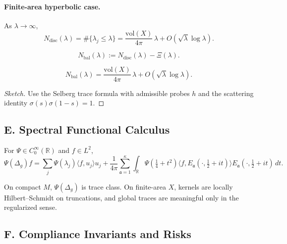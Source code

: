 \paragraph{Finite-area hyperbolic case.} As $\lambda\to\infty$,
\[
  N_{\mathrm{disc}}(\lambda)=\#\{\lambda_j\le \lambda\}
  = \frac{\mathrm{vol}(X)}{4\pi}\,\lambda + O(\sqrt{\lambda}\log\lambda).
\]

\begin{definition}
\[
  N_{\mathrm{bal}}(\lambda):=N_{\mathrm{disc}}(\lambda)-\Xi(\lambda).
\]
\end{definition}

\begin{theorem}
\label{thm:balanced-selberg}
\[
  N_{\mathrm{bal}}(\lambda)
  = \frac{\mathrm{vol}(X)}{4\pi}\,\lambda + O(\sqrt{\lambda}\log\lambda).
\]
\end{theorem}

\begin{proof}[Sketch]
Use the Selberg trace formula with admissible probes $h$ and the scattering identity $\sigma(s)\sigma(1-s)=1$.
\end{proof}

\subsection*{E. Spectral Functional Calculus}
\label{subsec:spec-func}

\begin{theorem}
\label{thm:spec-func}
For $\Psi\in C_0^\infty(\mathbb R)$ and $f\in L^2$,
\[
  \Psi(\Delta_g)f
  = \sum_j \Psi(\lambda_j)\langle f,u_j\rangle u_j
  + \frac{1}{4\pi}\sum_{\mathfrak a=1}^\kappa \int_{\mathbb R}
      \Psi\!\left(\tfrac14+t^2\right)
      \langle f,E_{\mathfrak a}(\cdot,\tfrac12+it)\rangle
      E_{\mathfrak a}(\cdot,\tfrac12+it)\,dt.
\]
\end{theorem}

\begin{remark}
On compact $M$, $\Psi(\Delta_g)$ is trace class. On finite-area $X$, kernels are locally Hilbert–Schmidt on truncations, and global traces are meaningful only in the regularized sense.
\end{remark}

\subsection*{F. Compliance Invariants and Risks}
\label{subsec:invariants}

